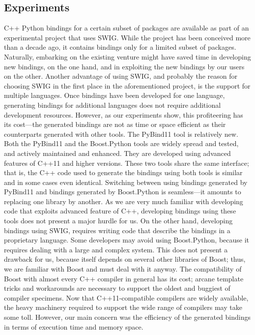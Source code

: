 \subsection{Experiments}
\label{ssec:comp:exp}
C++ Python bindings for a certain subset of \cgal{} packages are
available as part of an experimental project that uses SWIG. While the
project has been conceived more than a decade ago, it contains
bindings only for a limited subset of \cgal{} packages. Naturally,
embarking on the existing venture might have saved time in developing
new bindings, on the one hand, and in exploiting the new bindings by
our users on the other. Another advantage of using SWIG, and probably
the reason for choosing SWIG in the first place in the aforementioned
project, is the support for multiple languages. Once bindings have
been developed for one language, generating bindings for additional
languages does not require additional development resources. However,
as our experiments show, this profiteering has its cost---the
generated bindings are not as time or space efficient as their
counterparts generated with other tools. The PyBind11 tool is
relatively new. Both the PyBind11 and the Boost.Python tools are
widely spread and tested, and actively maintained and enhanced. They
are developed using advanced features of C++11 and higher
versions. These two tools share the same interface; that is, the C++
code used to generate the bindings using both tools is similar and in
some cases even identical. Switching between using bindings generated
by PyBind11 and bindings generated by Boost.Python is seamless---it
amounts to replacing one library by another.
%
As we are very much familiar with developing code that exploits
advanced feature of C++, developing bindings using these tools does
not present a major hurdle for us. On the other hand, developing
bindings using SWIG, requires writing code that describe the bindings
in a proprietary language.  Some developers may avoid using
Boost.Python, because it requires dealing with a large and complex
system. This does not present a drawback for us, because \cgal{}
itself depends on several other libraries of Boost; thus, we are
familiar with Boost and must deal with it anyway.
%
The compatibility of Boost with almost every C++ compiler in general
has its cost; arcane template tricks and workarounds are necessary to
support the oldest and buggiest of compiler specimens.  Now that
C++11-compatible compilers are widely available, the heavy machinery
required to support the wide range of compilers may take some toll. 
However, our main concern was the efficiency of the generated bindings 
in terms of execution time and memory space.

